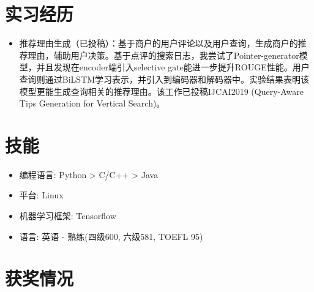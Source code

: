 \documentclass{resume}
\begin{document}
\section{实习经历}
\begin{itemize}
\item 推荐理由生成（已投稿）：基于商户的用户评论以及用户查询，生成商户的推荐理由，辅助用户决策。基于点评的搜索日志，我尝试了Pointer-generator模型，并且发现在encoder端引入selective gate能进一步提升ROUGE性能。用户查询则通过BiLSTM学习表示，并引入到编码器和解码器中。实验结果表明该模型更能生成查询相关的推荐理由。该工作已投稿IJCAI2019 (Query-Aware Tips Generation for Vertical Search)。

\end{itemize}


\section{技能}
\begin{itemize}[parsep=0.5ex]
  \item 编程语言: Python > C/C++ > Java
  \item 平台: Linux
  \item 机器学习框架: Tensorflow
  \item 语言: 英语 - 熟练(四级600, 六级581, TOEFL 95)

\end{itemize}

\section{获奖情况}

%
%
\end{document}

